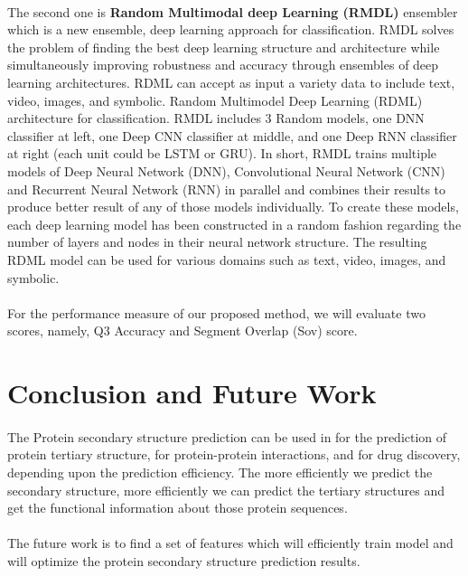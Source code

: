 \documentclass[12pt]{article}
\numberwithin{figure}{section}
\begin{document}
\paragraph{}
The second one is \textbf{Random Multimodal deep Learning (RMDL)} ensembler which is a new ensemble, deep learning approach for classification. RMDL solves the problem of finding the best deep learning structure and architecture while simultaneously improving robustness and accuracy through ensembles of deep learning architectures. RDML can accept as input a variety data to include text, video, images, and symbolic. Random Multimodel Deep Learning (RDML) architecture for classification. RMDL includes 3 Random models, one DNN classifier at left, one Deep CNN classifier at middle, and one Deep RNN classifier at right (each unit could be LSTM or GRU). In short, RMDL trains multiple models of Deep Neural Network (DNN), Convolutional Neural Network (CNN) and Recurrent Neural Network (RNN) in parallel and combines their results to produce better result of any of those models individually. To create these models, each deep learning model has been constructed in a random fashion regarding the number of layers and nodes in their neural network structure. The resulting RDML model can be used for various domains such as text, video, images, and symbolic.
\paragraph{}
For the performance measure of our proposed method, we will evaluate two scores, namely, Q3 Accuracy and Segment Overlap (Sov) score.
\section{Conclusion and Future Work}
\paragraph{}
The Protein secondary structure prediction can be used in for the prediction of protein tertiary structure, for protein-protein interactions, and for drug discovery, depending upon the prediction efficiency. The more efficiently we predict the secondary structure, more efficiently we can predict the tertiary structures and get the functional information about those protein sequences. 
\paragraph{}
The future work is to find a set of features which will efficiently train model and will optimize the protein secondary structure prediction results.
\clearpage
\end{document}
